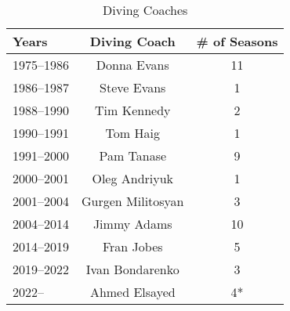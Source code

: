 \begin{table}[htbp]
\centering
\caption*{Diving Coaches}
\begin{tabular}{lcc}
\toprule
Years & Diving Coach & \# of Seasons \\
\midrule
1975--1986 & Donna Evans & 11 \\
1986--1987 & Steve Evans & 1 \\
1988--1990 & Tim Kennedy & 2 \\
1990--1991 & Tom Haig & 1 \\
1991--2000 & Pam Tanase & 9 \\
2000--2001 & Oleg Andriyuk & 1 \\
2001--2004 & Gurgen Militosyan & 3 \\
2004--2014 & Jimmy Adams & 10 \\
2014--2019 & Fran Jobes & 5 \\
2019--2022 & Ivan Bondarenko & 3 \\
2022-- & Ahmed Elsayed & 4* \\
\bottomrule
\end{tabular}
\end{table}

